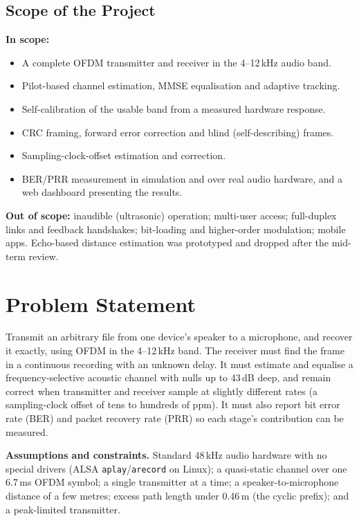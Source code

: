 \documentclass[11pt,a4paper]{report}
\begin{document}
\section{Scope of the Project}
\textbf{In scope:}
\begin{itemize}
    \item A complete OFDM transmitter and receiver in the 4--12\,kHz audio band.
    \item Pilot-based channel estimation, MMSE equalisation and adaptive tracking.
    \item Self-calibration of the usable band from a measured hardware response.
    \item CRC framing, forward error correction and blind (self-describing) frames.
    \item Sampling-clock-offset estimation and correction.
    \item BER/PRR measurement in simulation and over real audio hardware, and a web
    dashboard presenting the results.
\end{itemize}
\textbf{Out of scope:} inaudible (ultrasonic) operation; multi-user access;
full-duplex links and feedback handshakes; bit-loading and higher-order modulation;
mobile apps. Echo-based distance estimation was prototyped and dropped after the
mid-term review.

\chapter{Problem Statement}

Transmit an arbitrary file from one device's speaker to a microphone, and recover it
exactly, using OFDM in the 4--12\,kHz band. The receiver must find the frame in a
continuous recording with an unknown delay. It must estimate and equalise a
frequency-selective acoustic channel with nulls up to 43\,dB deep, and remain
correct when transmitter and receiver sample at slightly different rates (a
sampling-clock offset of tens to hundreds of ppm). It must also report bit error
rate (BER) and packet recovery rate (PRR) so each stage's contribution can be
measured.

\textbf{Assumptions and constraints.} Standard 48\,kHz audio hardware with no
special drivers (ALSA \texttt{aplay}/\texttt{arecord} on Linux); a quasi-static
channel over one 6.7\,ms OFDM symbol; a single transmitter at a time; a
speaker-to-microphone distance of a few metres; excess path length under
0.46\,m (the cyclic prefix); and a peak-limited transmitter.
\end{document}
